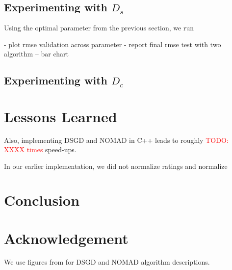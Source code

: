 \documentclass{article} %
\newcommand{\todo}[1]{\textcolor{red}{TODO: #1}}
\begin{document}
\subsection{Experimenting with $D_s$}

Using the optimal parameter from the previous section,
we run

- plot rmse validation across parameter
- report final rmse test with two algorithm -- bar chart

\subsection{Experimenting with $D_{c}$}



\section{Lessons Learned}

Also, implementing DSGD and NOMAD in C++ leads to roughly \todo{XXXX times} speed-ups.

In our earlier implementation, we did not normalize ratings and normalize

\section{Conclusion}

\section{Acknowledgement}
We use figures from \cite{yun2013nomad} for DSGD and NOMAD algorithm descriptions.


{}
\end{document}
